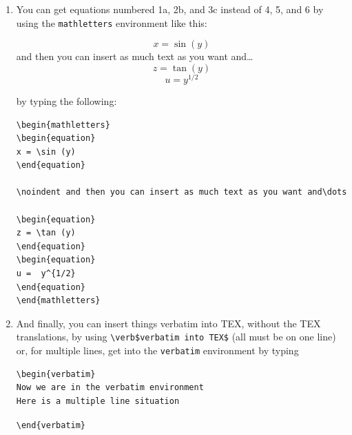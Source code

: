 \documentclass[11pt,preprint]{aastex}
\begin{document}
\begin{enumerate}
\item You can get equations numbered 1a, 2b, and 3c instead of 4, 5,
and 6 by using the \verb$mathletters$ environment like this:
\begin{mathletters}
\begin{equation}
x = \sin (y)
\end{equation}
\noindent and then you can insert as much text as you want and\dots
\begin{equation}
z = \tan (y)
\end{equation}
\begin{equation}
u =  y^{1/2}
\end{equation}
\end{mathletters}
by typing the following:
\begin{verbatim}
\begin{mathletters}
\begin{equation}
x = \sin (y)
\end{equation}

\noindent and then you can insert as much text as you want and\dots

\begin{equation}
z = \tan (y)
\end{equation}
\begin{equation}
u =  y^{1/2}
\end{equation}
\end{mathletters}
\end{verbatim}

\item And finally, you can insert things verbatim into TEX, without the
TEX translations, by using \verb=\verb$verbatim into TEX$= (all must be
on one line) or, for multiple lines, get into the \verb$verbatim$
environment by typing

\begin{verbatim}
\begin{verbatim}
Now we are in the verbatim environment
Here is a multiple line situation
\end{verbatim}
\verb$\end{verbatim}$

\end{enumerate}
\end{document}

